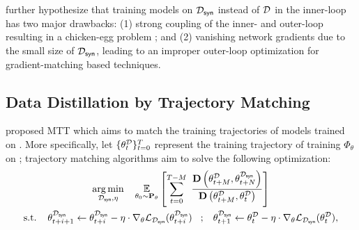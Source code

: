 \documentclass[10pt]{article} %
\begin{document}
\citet{idc} further hypothesize that training models on $\mathcal{D}_{\mathsf{syn}}$ instead of $\mathcal{D}$ in the inner-loop has two major drawbacks: (1) strong coupling of the inner- and outer-loop resulting in a chicken-egg problem \citep{em}; and (2) vanishing network gradients due to the small size of $\mathcal{D}_{\mathsf{syn}}$, leading to an improper outer-loop optimization for gradient-matching based techniques.

\subsection{Data Distillation by Trajectory Matching} \label{sec:traj_matching}
\citet{mtt} proposed MTT which aims to match the training trajectories of models trained on \dataset \vs \distill. More specifically, let $\{ \theta_t^\mathcal{D} \}_{t=0}^T$ represent the training trajectory of training $\Phi_\theta$ on \dataset; trajectory matching algorithms aim to solve the following optimization:
\begin{equation} \label{eqn:traj_matching}
\begin{gathered}
    \underset{\distill, \eta}{\operatorname{arg} \operatorname{min}} \hspace{0.4cm} \expectation{\substack{\theta_0 \sim \mathbf{P}_\theta}}{\sum_{t=0}^{T-M} ~ \frac{\mathbf{D}\left( \theta_{t+M}^\dataset, \theta_{t+N}^{\distill} \right)}{\mathbf{D}\left( \theta_{t+M}^\dataset, \theta_{t}^{\dataset} \right)}} \\ %
    \text{s.t.} \hspace{0.4cm} \theta_{t+i+1}^{\distill} \leftarrow \theta_{t+i}^{\distill} - \eta \cdot \nabla_\theta \mathcal{L}_{\distill}(\theta_{t+i}^{\distill}) \hspace{0.3cm};\hspace{0.3cm} \theta_{t+1}^{\distill} \leftarrow \theta_{t}^{\dataset} - \eta \cdot \nabla_\theta \mathcal{L}_{\distill}(\theta_{t}^{\dataset}) ,
\end{gathered}
\end{equation}
\end{document}
